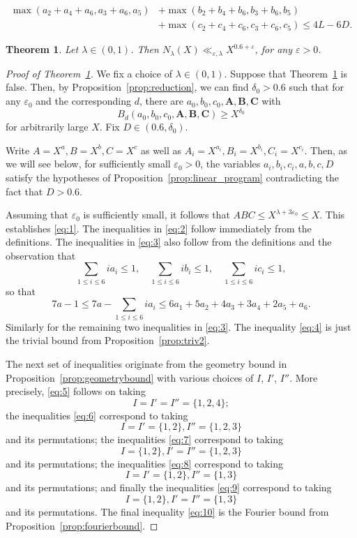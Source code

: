 \documentclass[10pt,a4paper]{amsart}
\newtheorem{theorem}{Theorem}
\def\Ab{\mathbf{A}}
\def\Bb{\mathbf{B}}
\def\Cb{\mathbf{C}}
\renewcommand{\ge}{\geqslant}
\renewcommand{\le}{\leqslant}
\renewcommand{\leq}{\leqslant}
\newcommand\ve{\varepsilon}
\begin{document}
\begin{equation}
\begin{split}
        \max(a_2+a_4+a_6,a_3+a_6,a_5)&+\max(b_2+b_4+b_6,b_3+b_6,b_5)\\
        &+\max(c_2+c_4+c_6,c_3+c_6,c_5) 
        \le 4L-6D.
\end{split}
\end{equation}

\begin{theorem} \label{thm:main_optimal}
Let $\lambda \in (0,1)$. Then $N_\lambda(X) \ll_{\ve,\lambda} X^{0.6+\ve}$, for any $\ve>0$.
\end{theorem}

\begin{proof}[Proof of Theorem~\ref{thm:main_optimal}]
We fix a choice of  $\lambda\in (0,1)$. 
Suppose that 
Theorem~\ref{thm:main_optimal} is false. Then, by Proposition~\ref{prop:reduction}, we can find $\delta_0>0.6$ such that for any $\varepsilon_0$ and the corresponding $d$, there are $a_0,b_0,c_0, \Ab,\Bb,\Cb$ with
    \[B_d(a_0,b_0,c_0,\Ab,\Bb,\Cb) \ge X^{\delta_0}\]
    for arbitrarily large $X$. Fix $D \in (0.6,\delta_0)$.

    Write $A=X^a, B=X^b, C=X^c$ as well as $A_i=X^{a_i}, B_i=X^{b_i}, C_i=X^{c_i}$. Then, as we will see below, for sufficiently small $\varepsilon_0>0$, the variables $a_i,b_i,c_i,a,b,c,D$ satisfy the hypotheses of Proposition~\ref{prop:linear_program} contradicting the fact that $D>0.6$.

Assuming that $\ve_0$ is sufficiently small, it follows that $ABC\leq X^{\lambda+3\ve_0}\leq X$. This establishes  \eqref{eq:1}. The 
inequalities in
  \eqref{eq:2} 
follow immediately from the definitions. 
The inequalities in \eqref{eq:3} also follow from the definitions and the observation that 
$$
\sum_{1\leq i\leq 6} ia_i \leq 1, \quad 
\sum_{1\leq i\leq 6} ib_i \leq 1, \quad
\sum_{1\leq i\leq 6} ic_i \leq 1,
$$
so that 
$$
7a-1\le 7a-\sum_{1\leq i\leq 6} ia_i\leq 6a_1+5a_2+4a_3+3a_4+2a_5+a_6.
$$
Similarly for the remaining two inequalities in \eqref{eq:3}.
The  inequality \eqref{eq:4} is just the trivial bound from Proposition~\ref{prop:triv2}.


    The next set of  inequalities originate from the geometry bound in Proposition~\ref{prop:geometrybound} with various choices of $I$, $I'$, $I''$. 
       More precisely, \eqref{eq:5} follows on taking
    \[
    I=I'=I''=\{1,2,4\};
    \]
the inequalities \eqref{eq:6} correspond to taking 
    \[
    I=I'=\{1,2\}, I''=\{1,2,3\}
    \]
    and its permutations;
the inequalities \eqref{eq:7} correspond to taking 
    \[
    I=\{1,2\}, I'=I''=\{1,2,3\}
    \]
    and its permutations; 
    the inequalities \eqref{eq:8} correspond to taking 
    \[
    I=I'=\{1,2\}, I''=\{1,3\}
    \]
    and its permutations; and finally
the inequalities \eqref{eq:9} correspond to taking 
    \[
    I=\{1,2\}, I'=I''=\{1,3\}
    \]
    and its permutations.
The final  inequality \eqref{eq:10} is the Fourier bound from Proposition~\ref{prop:fourierbound}.
\end{proof}
\end{document}
